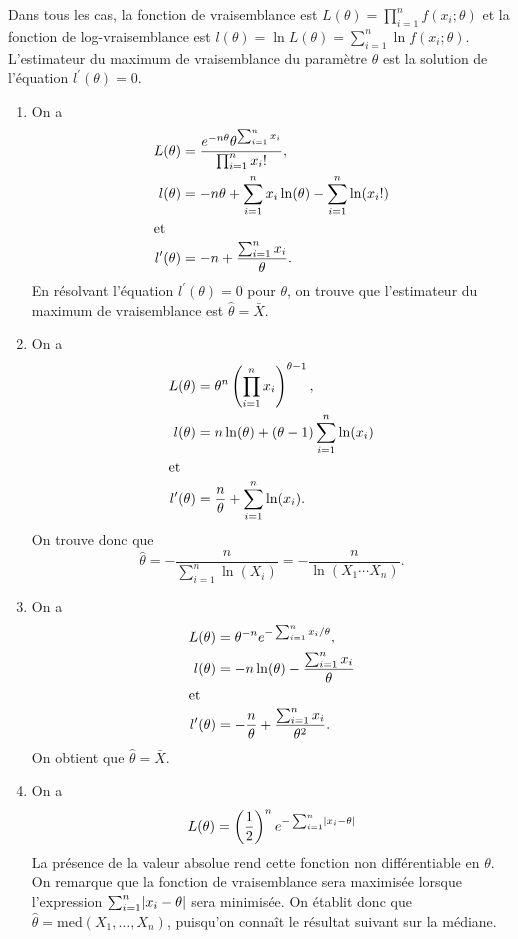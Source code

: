 \begin{solution}{4.8}
    Dans tous les cas, la fonction de vraisemblance est $L(\theta) =
    \prod_{i = 1}^n f(x_i; \theta)$ et la fonction de
    log-vraisemblance est $l(\theta) = \ln L(\theta) = \sum_{i = 1}^n
    \ln f(x_i; \theta)$. L'estimateur du maximum de vraisemblance du
    paramètre $\theta$ est la solution de l'équation $l^\prime(\theta)
    = 0$.
    \begin{enumerate}
    \item On a
      \begin{align*}
        L(\theta) &= \frac{e^{-n\theta} \theta^{\sum_{i=1}^n x_i}}{%
          \prod_{i=1}^n x_i!}, \\
        l(\theta) &= -n \theta  + \sum_{i = 1}^n x_i \ln(\theta)
        - \sum_{i=1}^n \ln(x_i!) \\
        \intertext{et}
        l^\prime(\theta) &= -n + \frac{\sum_{i = 1}^n x_i}{\theta}.
      \end{align*}
      En résolvant l'équation $l^\prime(\theta) = 0$ pour $\theta$, on
      trouve que l'estimateur du maximum de vraisemblance est
      $\hat{\theta} = \bar{X}$.
    \item On a
      \begin{align*}
        L(\theta) &= \theta^n
        \left(
          \prod_{i = 1}^n x_i
        \right)^{\theta - 1}, \\
        l(\theta) &= n \ln(\theta) +
        (\theta - 1) \sum_{i = 1}^n \ln(x_i) \\
        \intertext{et}
        l^\prime(\theta) &= \frac{n}{\theta} +
        \sum_{i = 1}^n \ln(x_i).
      \end{align*}
      On trouve donc que
      \begin{equation*}
      \hat{\theta} = -\frac{n}{\sum_{i=1}^n \ln(X_i)} =
      -\frac{n}{\ln(X_1 \cdots X_n)}.
      \end{equation*}
    \item  On a
      \begin{align*}
        L(\theta) &= \theta^{-n} e^{-\sum_{i=1}^n x_i/\theta}, \\
        l(\theta) &= -n \ln(\theta) - \frac{\sum_{i=1}^n x_i}{\theta} \\
        \intertext{et}
        l^\prime(\theta) &= -\frac{n}{\theta} +
        \frac{\sum_{i=1}^n x_i}{\theta^2}.
      \end{align*}
      On obtient que $\hat{\theta} = \bar{X}$.
    \item On a
      \begin{equation*}
        L(\theta) = \left( \frac{1}{2} \right)^n
        e^{-\sum_{i = 1}^n \lvert x_i - \theta \rvert}
      \end{equation*}
      La présence de la valeur absolue rend cette fonction non
      différentiable en $\theta$. On remarque que la fonction de
      vraisemblance sera maximisée lorsque l'expression $\sum_{i=1}^n
      \lvert x_i - \theta \rvert$ sera minimisée. On établit donc que $\hat{\theta} = \text{med}(X_1, \dots, X_n)$, puisqu'on connaît le résultat suivant sur la médiane.


\end{enumerate}
\end{solution}

